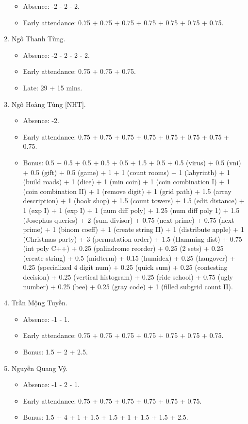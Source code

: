\documentclass{article}
\begin{document}
\begin{enumerate}
\begin{itemize}
		\item Absence: -2 - 2 - 2.
		\item Early attendance: 0.75 + 0.75 + 0.75 + 0.75 + 0.75 + 0.75 + 0.75.
	\end{itemize}
	\item {\sc Ngô Thanh Tùng.}
	\begin{itemize}
		\item Absence: -2 - 2 - 2 - 2.
		\item Early attendance: 0.75 + 0.75 + 0.75.
		\item Late: 29 + 15 mins.
	\end{itemize}
	\item {\sc Ngô Hoàng Tùng [NHT].}
	\begin{itemize}
        \item Absence: -2.
		\item Early attendance: 0.75 + 0.75 + 0.75 + 0.75 + 0.75 + 0.75 + 0.75 + 0.75.
		\item Bonus: 0.5 + 0.5 + 0.5 + 0.5 + 0.5 + 1.5 + 0.5 + 0.5 (virus) + 0.5 (vni) + 0.5 (gift) + 0.5 (game) + 1 + 1 (count rooms) + 1 (labyrinth) + 1 (build roads) + 1 (dice) + 1 (min coin) + 1 (coin combination I) + 1 (coin combination II) + 1 (remove digit) + 1 (grid path) + 1.5 (array description) + 1 (book shop) + 1.5 (count towers) + 1.5 (edit distance) + 1 (exp I) + 1 (exp I) + 1 (num diff poly) + 1.25 (num diff poly 1) + 1.5 (Josephus queries) + 2 (sum divisor) + 0.75 (next prime) + 0.75 (next prime) + 1 (binom coeff) + 1 (create string II) + 1 (distribute apple) + 1 (Christmas party) + 3 (permutation order) + 1.5 (Hamming dist) + 0.75 (int poly C++) + 0.25 (palindrome reorder) + 0.25 (2 sets) + 0.25 (create string) + 0.5 (midterm) + 0.15 (humidex) + 0.25 (hangover) + 0.25 (specialized 4 digit num) + 0.25 (quick sum)  + 0.25 (contesting decision) + 0.25 (vertical histogram) + 0.25 (ride school) + 0.75 (ugly number) + 0.25 (bee) + 0.25 (gray code) + 1 (filled subgrid count II).
	\end{itemize}
	\item {\sc Trần Mộng Tuyền.}
	\begin{itemize}
		\item Absence: -1 - 1.
		\item Early attendance: 0.75 + 0.75 + 0.75 + 0.75 + 0.75 + 0.75 + 0.75.
        \item Bonus: 1.5 + 2 + 2.5.
	\end{itemize}
	\item {\sc Nguyễn Quang Vỹ.}
	\begin{itemize}
		\item Absence: -1 - 2 - 1.
		\item Early attendance: 0.75 + 0.75 + 0.75 + 0.75 + 0.75 + 0.75.
		\item Bonus: 1.5 + 4 + 1 + 1.5 + 1.5 + 1 + 1.5 + 1.5 + 2.5.
	\end{itemize}
\end{enumerate}
\end{document}
